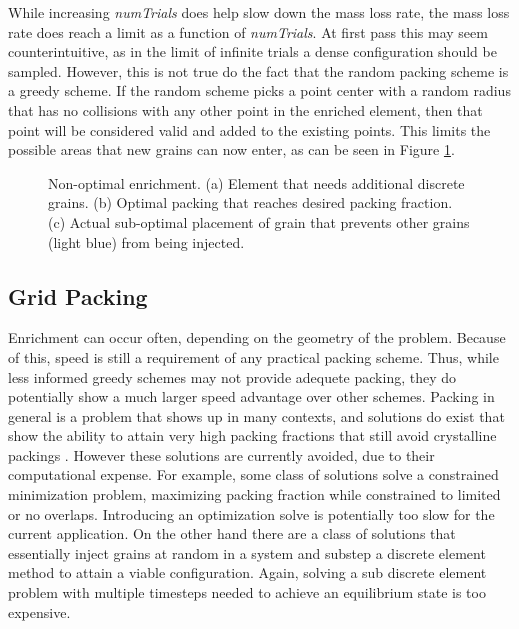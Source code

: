 While increasing \textit{numTrials} does help slow down the mass loss rate, the mass loss rate does reach a limit as a function of \textit{numTrials}. At first pass this may seem counterintuitive, as in the limit of infinite trials a dense configuration should be sampled. However, this is not true do the fact that the random packing scheme is a greedy scheme. If the random scheme picks a point center with a random radius that has no collisions with any other point in the enriched element, then that point will be considered valid and added to the existing points. This limits the possible areas that new grains can now enter, as can be seen in Figure \ref{greedy_dem}. 

\begin{figure}[htp] 
    \centering
    \caption{Non-optimal enrichment. (a) Element that needs additional discrete grains. (b) Optimal packing that reaches desired packing fraction. (c) Actual sub-optimal placement of grain that prevents other grains (light blue) from being injected.}%
    \label{greedy_dem}
\end{figure}

\subsection{Grid Packing}
Enrichment can occur often, depending on the geometry of the problem. Because of this, speed is still a requirement of any practical packing scheme. Thus, while less informed greedy schemes may not provide adequete packing, they do potentially show a much larger speed advantage over other schemes. Packing in general is a problem that shows up in many contexts, and solutions do exist that show the ability to attain very high packing fractions that still avoid crystalline packings %
. However these solutions are currently avoided, due to their computational expense. For example, some class of solutions solve a constrained minimization problem, maximizing packing fraction while constrained to limited or no overlaps. Introducing an optimization solve is potentially too slow for the current application. On the other hand there are a class of solutions that essentially inject grains at random in a system and substep a discrete element method to attain a viable configuration. Again, solving a sub discrete element problem with multiple timesteps needed to achieve an equilibrium state is too expensive.

